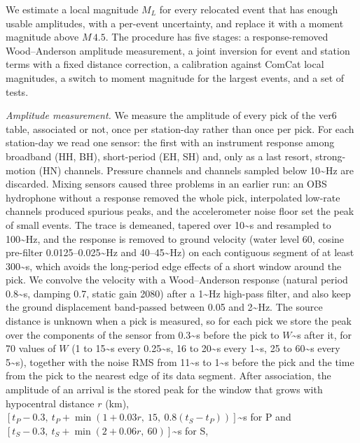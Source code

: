 \documentclass[review]{seismica}
\begin{document}
We estimate a local magnitude \(M_L\) for every relocated event that has
enough usable amplitudes, with a per-event uncertainty, and replace it
with a moment magnitude above \(M\,4.5\). The procedure has five stages:
a response-removed Wood--Anderson amplitude measurement, a joint
inversion for event and station terms with a fixed distance correction,
a calibration against ComCat local magnitudes, a switch to moment
magnitude for the largest events, and a set of tests.

\emph{Amplitude measurement.} We measure the amplitude of every pick of
the ver6 table, associated or not, once per station-day rather than once
per pick. For each station-day we read one sensor: the first with an
instrument response among broadband (HH, BH), short-period (EH, SH) and,
only as a last resort, strong-motion (HN) channels. Pressure channels
and channels sampled below 10\textasciitilde Hz are discarded. Mixing
sensors caused three problems in an earlier run: an OBS hydrophone
without a response removed the whole pick, interpolated low-rate
channels produced spurious peaks, and the accelerometer noise floor set
the peak of small events. The trace is demeaned, tapered over
10\textasciitilde s and resampled to 100\textasciitilde Hz, and the
response is removed to ground velocity (water level 60, cosine
pre-filter 0.0125--0.025\textasciitilde Hz and 40--45\textasciitilde Hz)
on each contiguous segment of at least 300\textasciitilde s, which
avoids the long-period edge effects of a short window around the pick.
We convolve the velocity with a Wood--Anderson response (natural period
0.8\textasciitilde s, damping 0.7, static gain 2080) after a
1\textasciitilde Hz high-pass filter, and also keep the ground
displacement band-passed between 0.05 and 2\textasciitilde Hz. The
source distance is unknown when a pick is measured, so for each pick we
store the peak over the components of the sensor from
0.3\textasciitilde s before the pick to \(W\)\textasciitilde s after it,
for 70 values of \(W\) (1 to 15\textasciitilde s every
0.25\textasciitilde s, 16 to 20\textasciitilde s every
1\textasciitilde s, 25 to 60\textasciitilde s every 5\textasciitilde s),
together with the noise RMS from 11\textasciitilde s to
1\textasciitilde s before the pick and the time from the pick to the
nearest edge of its data segment. After association, the amplitude of an
arrival is the stored peak for the window that grows with hypocentral
distance \(r\) (km),
\([t_P-0.3,\ t_P+\min(1+0.03r,\ 15,\ 0.8(t_S-t_P))]\)\textasciitilde s
for P and \([t_S-0.3,\ t_S+\min(2+0.06r,\ 60)]\)\textasciitilde s for S,
\end{document}
